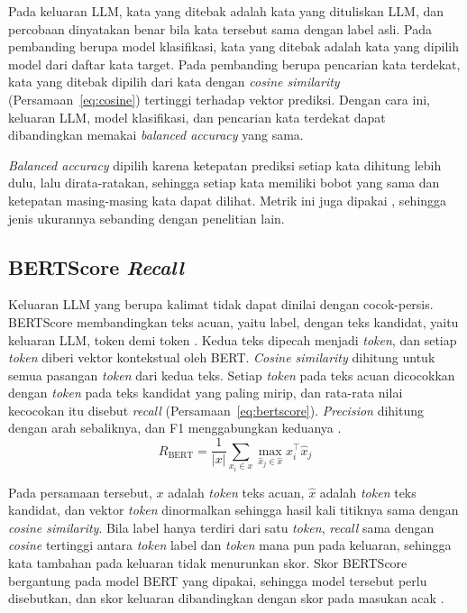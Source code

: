Pada keluaran LLM, kata yang ditebak adalah kata yang dituliskan LLM, dan percobaan dinyatakan benar bila kata tersebut sama dengan label asli.
Pada pembanding berupa model klasifikasi, kata yang ditebak adalah kata yang dipilih model dari daftar kata target.
Pada pembanding berupa pencarian kata terdekat, kata yang ditebak dipilih dari kata dengan \textit{cosine similarity} (Persamaan~\ref{eq:cosine}) tertinggi terhadap vektor prediksi.
Dengan cara ini, keluaran LLM, model klasifikasi, dan pencarian kata terdekat dapat dibandingkan memakai \textit{balanced accuracy} yang sama.

\textit{Balanced accuracy} dipilih karena ketepatan prediksi setiap kata dihitung lebih dulu, lalu dirata-ratakan, sehingga setiap kata memiliki bobot yang sama dan ketepatan masing-masing kata dapat dilihat.
Metrik ini juga dipakai \textcite{zhou2025}, sehingga jenis ukurannya sebanding dengan penelitian lain.

\subsection{BERTScore \textit{Recall}}
\label{sec:bertscore}
Keluaran LLM yang berupa kalimat tidak dapat dinilai dengan cocok-persis.
BERTScore membandingkan teks acuan, yaitu label, dengan teks kandidat, yaitu keluaran LLM, token demi token \parencite{zhang2020bertscore}.
Kedua teks dipecah menjadi \textit{token}, dan setiap \textit{token} diberi vektor kontekstual oleh BERT.
\textit{Cosine similarity} dihitung untuk semua pasangan \textit{token} dari kedua teks.
Setiap \textit{token} pada teks acuan dicocokkan dengan \textit{token} pada teks kandidat yang paling mirip, dan rata-rata nilai kecocokan itu disebut \textit{recall} (Persamaan~\ref{eq:bertscore}).
\textit{Precision} dihitung dengan arah sebaliknya, dan F1 menggabungkan keduanya \parencite{zhang2020bertscore}.
\begin{equation}
R_{\text{BERT}} = \frac{1}{|x|} \sum_{x_i \in x} \max_{\hat{x}_j \in \hat{x}} x_i^{\top} \hat{x}_j
\label{eq:bertscore}
\end{equation}

Pada persamaan tersebut, $x$ adalah \textit{token} teks acuan, $\hat{x}$ adalah \textit{token} teks kandidat, dan vektor \textit{token} dinormalkan sehingga hasil kali titiknya sama dengan \textit{cosine similarity}.
Bila label hanya terdiri dari satu \textit{token}, \textit{recall} sama dengan \textit{cosine} tertinggi antara \textit{token} label dan \textit{token} mana pun pada keluaran, sehingga kata tambahan pada keluaran tidak menurunkan skor.
Skor BERTScore bergantung pada model BERT yang dipakai, sehingga model tersebut perlu disebutkan, dan skor keluaran dibandingkan dengan skor pada masukan acak \parencite{yang2026cliplm}.

